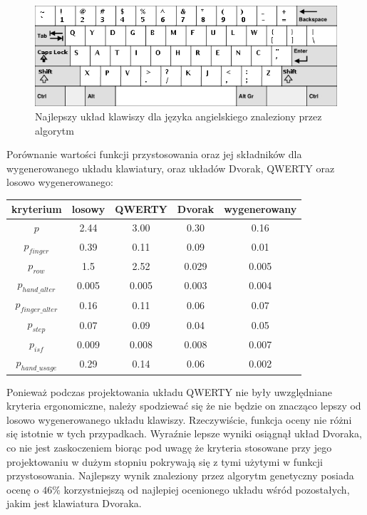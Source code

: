 \documentclass[brudnopis]{xmgr}
\begin{document}
\begin{figure}[!tbh]
\centering
\includegraphics[width=.8\hsize]{fig/best_en}
\caption{Najlepszy układ klawiszy dla języka angielskiego znaleziony przez algorytm}
\end{figure}

Porównanie wartości funkcji przystosowania oraz jej składników dla wygenerowanego układu klawiatury, oraz układów Dvorak, QWERTY oraz losowo wygenerowanego:\newline
\begin{tabular}{ c | c | c | c | c}
  kryterium & losowy & QWERTY & Dvorak & wygenerowany \\
  \hline
  $p$			&  2.44 &  3.00 &  0.30 &  0.16 \\
  $p_{finger}$          &  0.39 &  0.11 &  0.09 &  0.01 \\
  $p_{row}$             &   1.5 &  2.52 & 0.029 & 0.005 \\
  $p_{hand\_alter}$     & 0.005 & 0.005 & 0.003 & 0.004 \\
  $p_{finger\_alter}$   &  0.16 &  0.11 &  0.06 &  0.07 \\
  $p_{step}$            &  0.07 &  0.09 &  0.04 &  0.05 \\
  $p_{isf}$             & 0.009 & 0.008 & 0.008 & 0.007 \\
  $p_{hand\_usage}$     &  0.29 &  0.14 &  0.06 & 0.002 \\
\end{tabular}\newline\newline

Ponieważ podczas projektowania układu QWERTY nie były uwzględniane kryteria ergonomiczne, należy spodziewać się że nie będzie on znacząco lepszy od losowo wygenerowanego układu klawiszy. Rzeczywiście, funkcja oceny nie różni się istotnie w tych przypadkach. Wyraźnie lepsze wyniki osiągnął układ Dvoraka, co nie jest zaskoczeniem biorąc pod uwagę że kryteria stosowane przy jego projektowaniu w dużym stopniu pokrywają się z tymi użytymi w funkcji przystosowania. Najlepszy wynik znaleziony przez algorytm genetyczny posiada ocenę o $46\%$ korzystniejszą od najlepiej ocenionego układu wśród pozostałych, jakim jest klawiatura Dvoraka.
\end{document}

